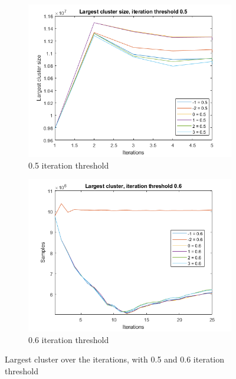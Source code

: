 \begin{figure}
    \centering
    \begin{subfigure}[b]{.45\textwidth}
        \centering
        \includegraphics[width=\textwidth]{figures/largest-0.5.png}
        \caption{0.5 iteration threshold}
        \label{sfig:iter:largestcluster0.5}
    \end{subfigure}
    \hfill
    \begin{subfigure}[b]{.45\textwidth}
        \centering
        \includegraphics[width=\textwidth]{figures/largest-0.6.png}
        \caption{0.6 iteration threshold}
        \label{sfig:iter:largestcluster0.6}
    \end{subfigure}
    \caption{Largest cluster over the iterations, with 0.5 and 0.6 iteration threshold}
    \label{fig:iter:largestcluster0.50.6}
\end{figure}

